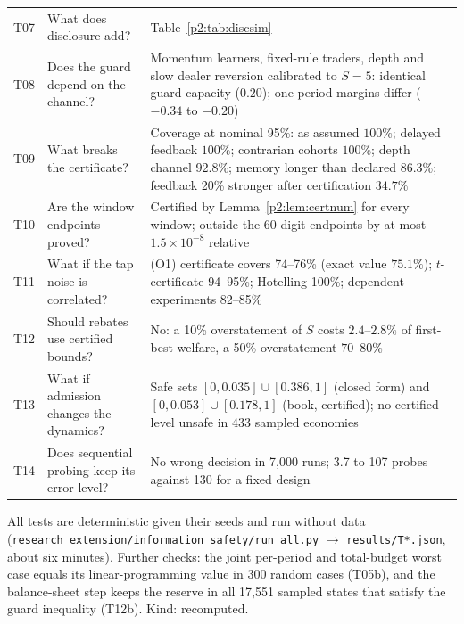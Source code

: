 \begin{table}[!tbp]
\begin{threeparttable}
\begin{tabular}{p{}p{}p{}}
T07 & What does disclosure add? & Table~\ref{p2:tab:discsim}\\
T08 & Does the guard depend on the channel? & Momentum learners, fixed-rule traders, depth and slow dealer reversion calibrated to $S=5$: identical guard capacity ($0.20$); one-period margins differ ($-0.34$ to $-0.20$)\\
T09 & What breaks the certificate? & Coverage at nominal 95\%: as assumed $100\%$; delayed feedback $100\%$; contrarian cohorts $100\%$; depth channel $92.8\%$; memory longer than declared $86.3\%$; feedback 20\% stronger after certification $34.7\%$\\
T10 & Are the window endpoints proved? & Certified by Lemma~\ref{p2:lem:certnum} for every window; outside the 60-digit endpoints by at most $1.5\times10^{-8}$ relative\\
T11 & What if the tap noise is correlated? & (O1) certificate covers 74--76\% (exact value $75.1\%$); $t$-certificate 94--95\%; Hotelling 100\%; dependent experiments 82--85\%\\
T12 & Should rebates use certified bounds? & No: a 10\% overstatement of $S$ costs $2.4$--$2.8\%$ of first-best welfare, a 50\% overstatement $70$--$80\%$\\
T13 & What if admission changes the dynamics? & Safe sets $[0,0.035]\cup[0.386,1]$ (closed form) and $[0,0.053]\cup[0.178,1]$ (book, certified); no certified level unsafe in 433 sampled economies\\
T14 & Does sequential probing keep its error level? & No wrong decision in 7{,}000 runs; 3.7 to 107 probes against 130 for a fixed design\\
\bottomrule
\end{tabular}
\begin{tablenotes}\footnotesize\item All tests are deterministic given their seeds and run without data (\texttt{research\_extension/information\_safety/run\_all.py} $\to$ \texttt{results/T*.json}, about six minutes). Further checks: the joint per-period and total-budget worst case equals its linear-programming value in 300 random cases (T05b), and the balance-sheet step keeps the reserve in all 17{,}551 sampled states that satisfy the guard inequality (T12b). Kind: recomputed. \end{tablenotes}
\end{threeparttable}
\end{table}

